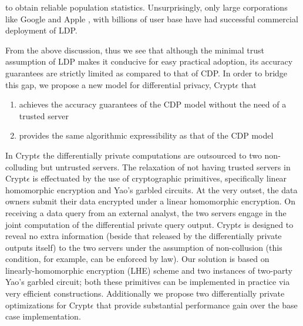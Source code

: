 to obtain reliable population statistics. Unsurprisingly, only large corporations  like Google \cite{Rappor1,Rappor2,Prochlo} and Apple \cite{Apple}, with  billions of user base have had successful commercial deployment of \textsf{LDP}. %
\par From the above discussion, thus we see that although the minimal trust assumption of \textsf{LDP} makes it conducive for easy practical adoption, its accuracy guarantees are strictly limited as compared to that of \textsf{CDP}. In order to bridge this gap, we propose a new model for differential privacy, Crypt$\epsilon$ that  \begin{enumerate}\item achieves the accuracy guarantees of the \textsf{CDP} model without the need of a trusted server \item provides the same algorithmic expressibility as that of the \textsf{CDP} model \end{enumerate} 
In Crypt$\epsilon$ the differentially private computations are outsourced to two non-colluding but untrusted servers. The relaxation of not having trusted servers in Crypt$\epsilon$ is effectuated by the use of cryptographic primitives, specifically linear homomorphic encryption and Yao's garbled circuits.  At the very outset, the data owners submit their data encrypted under a linear homomorphic encryption. On receiving a data query from an external analyst, the two servers engage in the joint computation of the differential private query output. Crypt$\epsilon$ is designed to reveal no extra information (beside that released by the differentially private outputs itself) to
the two servers under the assumption of  non-collusion (this condition, for example, can be enforced by law). Our solution is  based on linearly-homomorphic
encryption (LHE) scheme and two instances of two-party Yao's garbled circuit; both these primitives can be implemented in practice via very efficient constructions. Additionally we propose two differentially private optimizations for Crypt$\epsilon$ that provide substantial performance gain over the base case implementation.
\par %



